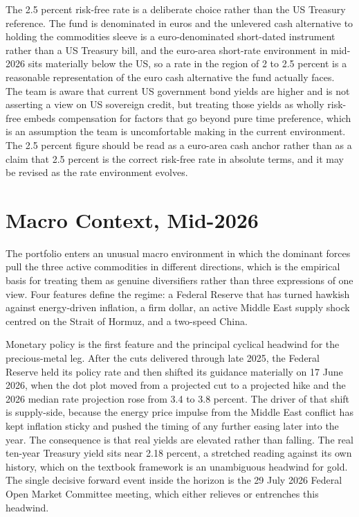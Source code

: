 \documentclass[11pt,a4paper]{article}
\begin{document}
The 2.5 percent risk-free rate is a deliberate choice rather than the US Treasury reference. The fund is denominated in euros and the unlevered cash alternative to holding the commodities sleeve is a euro-denominated short-dated instrument rather than a US Treasury bill, and the euro-area short-rate environment in mid-2026 sits materially below the US, so a rate in the region of 2 to 2.5 percent is a reasonable representation of the euro cash alternative the fund actually faces. The team is aware that current US government bond yields are higher and is not asserting a view on US sovereign credit, but treating those yields as wholly risk-free embeds compensation for factors that go beyond pure time preference, which is an assumption the team is uncomfortable making in the current environment. The 2.5 percent figure should be read as a euro-area cash anchor rather than as a claim that 2.5 percent is the correct risk-free rate in absolute terms, and it may be revised as the rate environment evolves.

\section{Macro Context, Mid-2026}

The portfolio enters an unusual macro environment in which the dominant forces pull the three active commodities in different directions, which is the empirical basis for treating them as genuine diversifiers rather than three expressions of one view. Four features define the regime: a Federal Reserve that has turned hawkish against energy-driven inflation, a firm dollar, an active Middle East supply shock centred on the Strait of Hormuz, and a two-speed China.

Monetary policy is the first feature and the principal cyclical headwind for the precious-metal leg. After the cuts delivered through late 2025, the Federal Reserve held its policy rate and then shifted its guidance materially on 17 June 2026, when the dot plot moved from a projected cut to a projected hike and the 2026 median rate projection rose from 3.4 to 3.8 percent. The driver of that shift is supply-side, because the energy price impulse from the Middle East conflict has kept inflation sticky and pushed the timing of any further easing later into the year. The consequence is that real yields are elevated rather than falling. The real ten-year Treasury yield sits near 2.18 percent, a stretched reading against its own history, which on the textbook framework is an unambiguous headwind for gold. The single decisive forward event inside the horizon is the 29 July 2026 Federal Open Market Committee meeting, which either relieves or entrenches this headwind.
\end{document}
